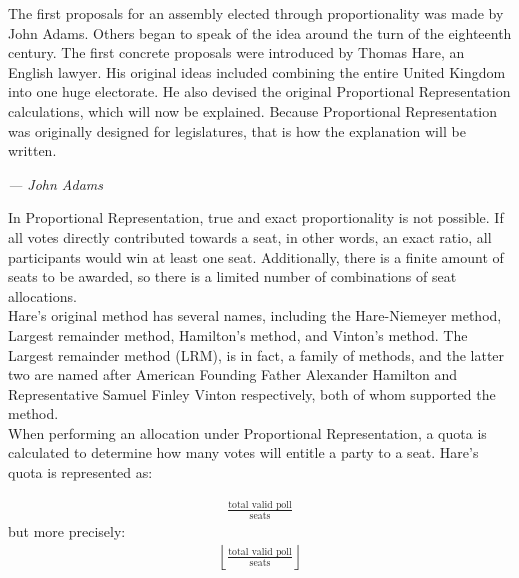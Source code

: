\documentclass{article}
\begin{document}
    The first proposals for an assembly elected through proportionality was made by John Adams. Others began to speak of the idea around the turn of the eighteenth century. The first concrete proposals were introduced by Thomas Hare, an English lawyer. His original ideas included combining the entire United Kingdom into one huge electorate. He also devised the original Proportional Representation calculations, which will now be explained. Because Proportional Representation was originally designed for legislatures, that is how the explanation will be written. \\

    \begin{flushright}\textit{--- John Adams}\end{flushright}%

    In Proportional Representation, true and exact proportionality is not possible. If all votes directly contributed towards a seat, in other words, an exact ratio, all participants would win at least one seat. Additionally, there is a finite amount of seats to be awarded, so there is a limited number of combinations of seat allocations. \\

    Hare's original method has several names, including the Hare-Niemeyer method, Largest remainder method, Hamilton's method, and Vinton's method. The Largest remainder method (LRM), is in fact, a family of methods, and the latter two are named after American Founding Father Alexander Hamilton and Representative Samuel Finley Vinton respectively, both of whom supported the method. \\

    When performing an allocation under Proportional Representation, a quota is calculated to determine how many votes will entitle a party to a seat. Hare's quota is represented as:%

    \begin{align}
        \frac{\text{total valid poll}}{\text{seats}}
    \end{align}
    but more precisely:%
    \begin{align}
        \left \lfloor \frac{\text{total valid poll}}{\text{seats}} \right \rfloor
    \end{align}
\end{document}
